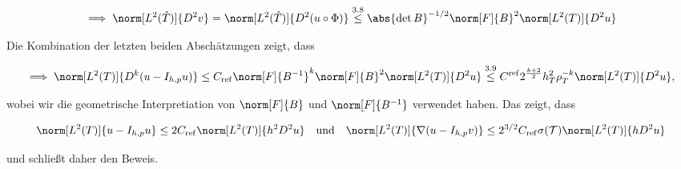\begin{solution}
\begin{enumerate}[label = \textbf{\alph*)}]
\begin{enumerate}[label = \arabic*.]
    \begin{align*}
      \implies
      \norm[L^2(\hat T)]{D^2 v}
      =
      \norm[L^2(\hat T)]{D^2 (u \circ \Phi)}
      \stackrel
      {
        \mathrm{3.8}
      }{\leq}
      \abs{\det B}^{-1/2} \norm[F]{B}^2 \norm[L^2(T)]{D^2 u}
    \end{align*}

    Die Kombination der letzten beiden Abschätzungen zeigt, dass

    \begin{align*}
      \implies
      \norm[L^2(T)]{D^k (u - I_{h, p} u)}
      \leq
      C_\mathrm{ref} \norm[F]{B^{-1}}^k \norm[F]{B}^2 \norm[L^2(T)]{D^2 u}
      \stackrel
      {
        \mathrm{3.9}
      }{\leq}
      C^\mathrm{ref} 2^\frac{k+2}{2} h_T^2 \rho_T^{-k} \norm[L^2(T)]{D^2 u},
    \end{align*}

    wobei wir die geometrische Interpretiation von $\norm[F]{B}$ und $\norm[F]{B^{-1}}$ verwendet haben.
    Das zeigt, dass

    \begin{align*}
      \norm[L^2(T)]{u - I_{h, p} u}
      \leq
      2 C_\mathrm{ref} \norm[L^2(T)]{h^2 D^2 u}
      \quad
      \text{und}
      \quad
      \norm[L^2(T)]{\nabla (u - I_{h, p} v)}
      \leq 2^{3/2} C_\mathrm{ref} \sigma(\mathcal{T}) \norm[L^2(T)]{h D^2 u}
    \end{align*}

    und schließt daher den Beweis.

  \end{enumerate}

\end{enumerate}

\end{solution}

